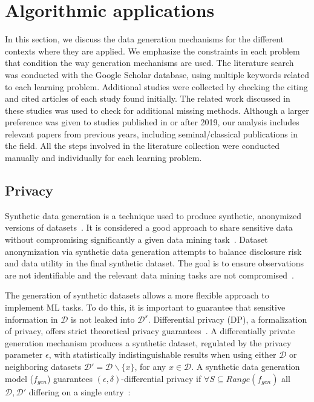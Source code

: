 \section{Algorithmic applications}\label{sec:algorithmic-applications}

In this section, we discuss the data generation mechanisms for the different
contexts where they are applied. We emphasize the constraints in each problem
that condition the way generation mechanisms are used. The literature search
was conducted with the Google Scholar database, using multiple keywords
related to each learning problem. Additional studies were collected by
checking the citing and cited articles of each study found initially. The
related work discussed in these studies was used to check for additional missing
methods. Although a larger preference was given to studies published in or
after 2019, our analysis includes relevant papers from previous years,
including seminal/classical publications in the field. All the steps involved
in the literature collection were conducted manually and individually for each
learning problem.

\subsection{Privacy}\label{sec:data-privacy}

Synthetic data generation is a technique used to produce synthetic, anonymized
versions of datasets~\cite{dankar2021fake}. It is considered a good approach
to share sensitive data without compromising significantly a given data mining
task~\cite{taub2018differential, park2018data}. Dataset anonymization via synthetic
data generation attempts to balance disclosure risk and data utility in the
final synthetic dataset. The goal is to ensure observations are not
identifiable and the relevant data mining tasks are not
compromised~\cite{singh2017aggregating, li2018privacy}.

The generation of synthetic datasets allows a more flexible approach to
implement ML tasks. To do this, it is important to guarantee that sensitive
information in $\mathcal{D}$ is not leaked into $\mathcal{D}^s$. Differential
privacy (DP), a formalization of privacy, offers strict theoretical privacy
guarantees~\cite{rosenblatt2020differentially}. A differentially private
generation mechanism produces a synthetic dataset, regulated by the privacy
parameter $\epsilon$, with statistically indistinguishable results when using
either $\mathcal{D}$ or neighboring datasets $\mathcal{D}' = \mathcal{D}
\backslash \{x\}$, for any $x \in \mathcal{D}$. A synthetic data generation
model ($f_{gen}$) guarantees $(\epsilon, \delta)$-differential privacy if
$\forall S \subseteq Range(f_{gen})$ all $\mathcal{D}, \mathcal{D}'$ differing
on a single entry~\cite{hardt2012simple}:

